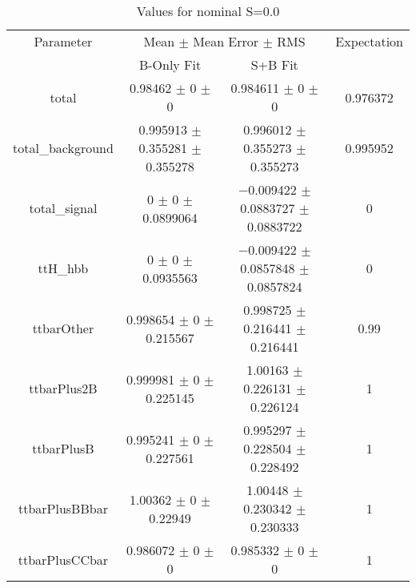 \begin{table}
\centering
\caption{Values for nominal S=0.0}
\begin{tabular}{cccc}
\toprule
Parameter & \multicolumn{2}{c}{Mean $\pm$ Mean Error $\pm$ RMS} & Expectation\\
 & B-Only Fit & S+B Fit & \\
\midrule
total & \num{0.98462} $\pm$ \num{0} $\pm$ \num{0} & \num{0.984611} $\pm$ \num{0} $\pm$ \num{0} & \num{0.976372}\\
total\_background & \num{0.995913} $\pm$ \num{0.355281} $\pm$ \num{0.355278} & \num{0.996012} $\pm$ \num{0.355273} $\pm$ \num{0.355273} & \num{0.995952}\\
total\_signal & \num{0} $\pm$ \num{0} $\pm$ \num{0.0899064} & \num{-0.009422} $\pm$ \num{0.0883727} $\pm$ \num{0.0883722} & \num{0}\\
ttH\_hbb & \num{0} $\pm$ \num{0} $\pm$ \num{0.0935563} & \num{-0.009422} $\pm$ \num{0.0857848} $\pm$ \num{0.0857824} & \num{0}\\
ttbarOther & \num{0.998654} $\pm$ \num{0} $\pm$ \num{0.215567} & \num{0.998725} $\pm$ \num{0.216441} $\pm$ \num{0.216441} & \num{0.99}\\
ttbarPlus2B & \num{0.999981} $\pm$ \num{0} $\pm$ \num{0.225145} & \num{1.00163} $\pm$ \num{0.226131} $\pm$ \num{0.226124} & \num{1}\\
ttbarPlusB & \num{0.995241} $\pm$ \num{0} $\pm$ \num{0.227561} & \num{0.995297} $\pm$ \num{0.228504} $\pm$ \num{0.228492} & \num{1}\\
ttbarPlusBBbar & \num{1.00362} $\pm$ \num{0} $\pm$ \num{0.22949} & \num{1.00448} $\pm$ \num{0.230342} $\pm$ \num{0.230333} & \num{1}\\
ttbarPlusCCbar & \num{0.986072} $\pm$ \num{0} $\pm$ \num{0} & \num{0.985332} $\pm$ \num{0} $\pm$ \num{0} & \num{1}\\
\bottomrule
\end{tabular}
\end{table}